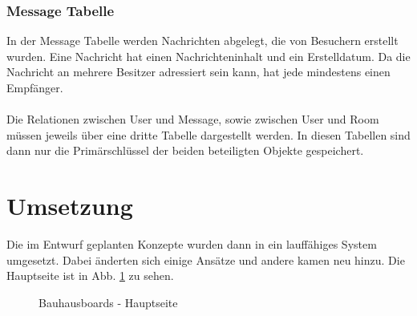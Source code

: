 \subsubsection{Message Tabelle}\label{Message Tabelle}
In der Message Tabelle werden Nachrichten abgelegt, die von Besuchern erstellt wurden. Eine Nachricht hat einen Nachrichteninhalt und ein Erstelldatum. Da die Nachricht an mehrere Besitzer adressiert sein kann, hat jede mindestens einen Empfänger.
\\
\\
Die Relationen zwischen User und Message, sowie zwischen User und Room müssen jeweils über eine dritte Tabelle dargestellt werden.
In diesen Tabellen sind dann nur die Primärschlüssel der beiden beteiligten Objekte gespeichert.






















\section{Umsetzung}\label{Umsetzung}
Die im Entwurf geplanten Konzepte wurden dann in ein lauffähiges System umgesetzt.
Dabei änderten sich einige Ansätze und andere kamen neu hinzu.
Die Hauptseite ist in Abb. \ref{img:finalHauptseite} zu sehen.
\begin{figure}[h!]
  \centering
  \caption{Bauhausboards - Hauptseite}
  \label{img:finalHauptseite}
\end{figure}


